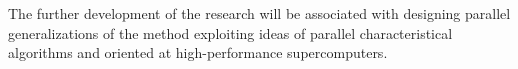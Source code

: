 \documentclass[runningheads]{llncs}
\begin{document}
The further development of the research will be associated with designing parallel generalizations of the method exploiting ideas of parallel characteristical algorithms and oriented at high-performance  supercomputers.


%
%
%
% 
% 
%








\end{document}
